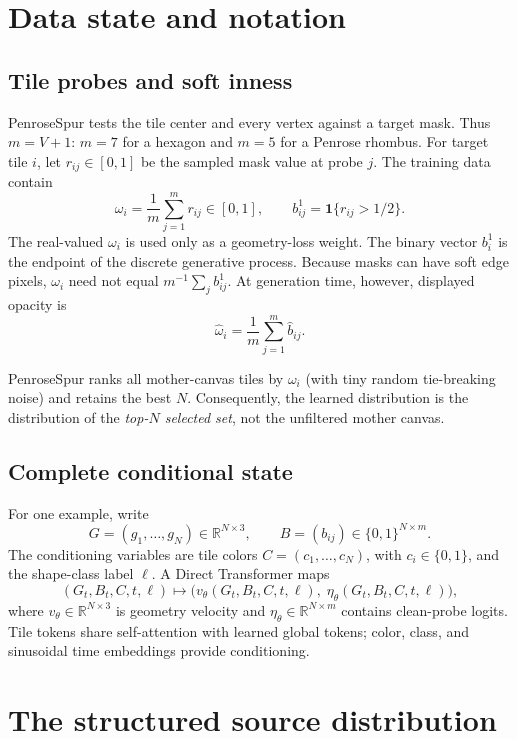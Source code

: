 \documentclass[11pt]{article}
\newcommand{\R}{\mathbb{R}}
\newcommand{\1}{\mathbf{1}}
\begin{document}
\section{Data state and notation}

\subsection{Tile probes and soft inness}

PenroseSpur tests the tile center and every vertex against a target mask.
Thus \(m=V+1\): \(m=7\) for a hexagon and \(m=5\) for a Penrose rhombus.
For target tile \(i\), let \(r_{ij}\in[0,1]\) be the sampled mask value at
probe \(j\).  The training data contain
\[
  \omega_i=\frac1m\sum_{j=1}^m r_{ij}\in[0,1],
  \qquad
  b^1_{ij}=\1\{r_{ij}>1/2\}.
\]
The real-valued \(\omega_i\) is used only as a geometry-loss weight.  The
binary vector \(b_i^1\) is the endpoint of the discrete generative process.
Because masks can have soft edge pixels, \(\omega_i\) need not equal
\(m^{-1}\sum_j b^1_{ij}\).  At generation time, however, displayed opacity is
\[
  \widehat\omega_i=\frac1m\sum_{j=1}^m \widehat b_{ij}.
\]

PenroseSpur ranks all mother-canvas tiles by \(\omega_i\) (with tiny random
tie-breaking noise) and retains the best \(N\).  Consequently, the learned
distribution is the distribution of the \emph{top-\(N\) selected set}, not the
unfiltered mother canvas.

\subsection{Complete conditional state}

For one example, write
\[
  G=(g_1,\ldots,g_N)\in\R^{N\times3},\qquad
  B=(b_{ij})\in\{0,1\}^{N\times m}.
\]
The conditioning variables are tile colors \(C=(c_1,\ldots,c_N)\), with
\(c_i\in\{0,1\}\), and the shape-class label \(\ell\).  A Direct Transformer
maps
\[
  (G_t,B_t,C,t,\ell)\longmapsto
  \bigl(v_\theta(G_t,B_t,C,t,\ell),\;
        \eta_\theta(G_t,B_t,C,t,\ell)\bigr),
\]
where \(v_\theta\in\R^{N\times3}\) is geometry velocity and
\(\eta_\theta\in\R^{N\times m}\) contains clean-probe logits.  Tile tokens share
self-attention with learned global tokens; color, class, and sinusoidal time
embeddings provide conditioning.

\section{The structured source distribution}
\end{document}
